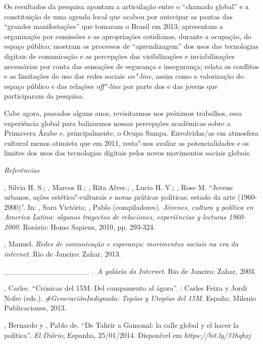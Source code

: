 Os resultados da pesquisa apontam a articulação entre o ``chamado
global'' e a constituição de uma agenda local que acabou por antecipar
as pautas das ``grandes manifestações'' que tomaram o Brasil em 2013;
apresentam a organização por comissões e as apropriações cotidianas,
durante a ocupação, do espaço público; mostram os processos de
``aprendizagem'' dos usos das tecnologias digitais de comunicação e as
percepções das visibilizações e inviabilizações necessárias por conta
das sensações de segurança e insegurança; relata os conflitos e as
limitações do uso das redes sociais \emph{on"-line}, assim como a
valorização do espaço público e das relações \emph{off"-line} por parte
dos e das jovens que participaram da pesquisa.

Cabe agora, passados alguns anos, revisitarmos nos próximos trabalhos,
essa experiência global para balizarmos nossas percepções acadêmicas
sobre a Primavera Árabe e, principalmente, o Ocupa Sampa. Envolvidas/as
em atmosfera cultural menos otimista que em 2011, resta"-nos avaliar as
potencialidades e os limites dos usos das tecnologias digitais pelos
novos movimentos sociais globais.

\emph{Referências}

, Silvia H. S.; , Marcos R.; , Rita Alves.; ,
Lucia H. V.; , Rose M. ``Jovens urbanos, ações estético"-culturais e
novas práticas políticas: estado da arte (1960-2000)''. In: ,
Sara Victória; , Pablo (compiladores). \emph{Jóvenes, cultura y
política en America Latina: algunos trayectos de  relaciones,
experiências y lecturas 1960-2000}. Rosário: Homo Sapiens, 2010, pp.
293-324.

, Manuel. \emph{Redes de comunicação e esperança: movimentos
sociais na era da internet}. Rio de Janeiro: Zahar, 2013.

\_\_\_\_\_\_\_\_\_\_\_\_\_\_\_\_ .~\emph{A galáxia da Internet}. Rio de
Janeiro: Zahar, 2003.

, Carles. ``Crónicas del 15M: Del campamento al ágora''. : Carles
Feixa y Jordi Nofre (eds.). \emph{\#GeneraciónIndignada: Topías y
Utopías del 15M}. España: Milenio Publicaciones, 2013.

, Bernardo y , Pablo de. ``De Tahrir a Gamonal: la calle
global y el hacer la política''. \emph{El Diário}, Espanha, 25/01/2014.
Disponível em
\emph{https://bit.ly/31hqhxj}

